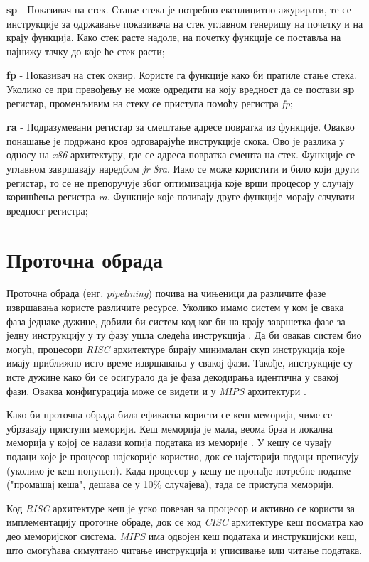 \documentclass[12pt,oneside]{memoir}
\begin{document}
\textbf{sp} - Показивач на стек. Стање стека је потребно експлицитно ажурирати, те се инструкције за одржавање
показивача на стек углавном генеришу на почетку и на крају функција. Како стек расте надоле, на почетку функције се
поставља на најнижу тачку до које ће стек расти;

\textbf{fp} - Показивач на стек оквир. Користе га функције како би пратиле стање стека. Уколико се при
превођењу не може одредити на коју вредност да се постави \textbf{sp} регистар, променљивим на стеку се приступа
помоћу регистра \textit{fp};

\textbf{ra} - Подразумевани регистар за смештање адресе повратка из функције. Овакво понашање је подржано кроз
одговарајуће инструкције скока. Ово је разлика у односу на \textit{x86} архитектуру, где се адреса повратка смешта
на стек. Функције се углавном завршавају наредбом \textit{jr \$ra}. Иако се може користити и било који други
регистар, то се не препоручује због оптимизација које врши процесор у случају коришћења регистра \textit{ra}. Функције које
позивају друге функције морају сачувати вредност регистра;

\section{Проточна обрада} \label{chp:PIPE}

Проточна обрада (енг. \textit{pipelining}) почива на чињеници да различите фазе извршавања користе различите
ресурсе. Уколико имамо систем у ком је свака фаза једнаке дужине, добили би систем код ког би на крају завршетка
фазе за једну инструкцију у ту фазу ушла следећа инструкција \cite{SMR}. Да би овакав систем био могућ, процесори
\textit{RISC} архитектуре бирају минималан скуп инструкција које имају приближно исто време извршавања у свакој
фази. Такође, инструкције су исте дужине како би се осигурало да је фаза декодирања идентична у свакој фази. Оваква
конфигурација може се видети и у \textit{MIPS} архитектури \cite{SMR}.

Како би проточна обрада била ефикасна користи се кеш меморија, чиме се убрзавају приступи меморији. Кеш меморија је
мала, веома брза и локална меморија у којој се налази копија података из меморије \cite{SMR}. У кешу се чувају подаци
које је процесор најскорије користио, док се најстарији подаци преписују (уколико је кеш попуњен). Када процесор
у кешу не пронађе потребне податке ("промашај кеша", дешава се у 10\% случајева), тада се приступа меморији.

Код \textit{RISC} архитектуре кеш је уско повезан за процесор и активно се користи за имплементацију проточне
обраде, док се код \textit{CISC} архитектуре кеш посматра као део меморијског система. \textit{MIPS} има одвојен кеш
података и инструкцијски кеш, што омогућава симултано читање инструкција и уписивање или читање података.
\end{document}
